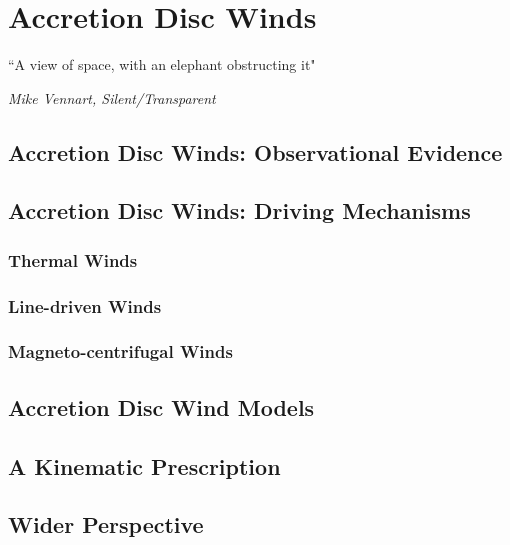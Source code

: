 \chapter{Accretion Disc Winds}

\epigraph{``A view of space, with an elephant obstructing it"}
{{\sl Mike Vennart, Silent/Transparent}}


\section{Accretion Disc Winds: Observational Evidence}

\section{Accretion Disc Winds: Driving Mechanisms}

\subsection{Thermal Winds}

\subsection{Line-driven Winds}

\subsection{Magneto-centrifugal Winds}

\section{Accretion Disc Wind Models}


\section{A Kinematic Prescription}

\section{Wider Perspective}

